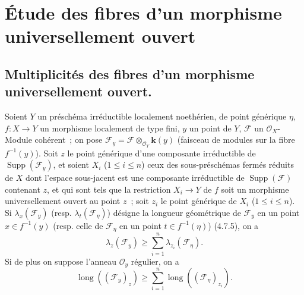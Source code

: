 \section{Étude des fibres d'un morphisme universellement ouvert}
\label{section:IV.15-fr}

\subsection{Multiplicités des fibres d'un morphisme universellement ouvert.}
\label{subsection:IV.15.1-fr}

\begin{proposition}[15.1.1]
\label{IV.15.1.1-fr}
Soient $Y$ un préschéma irréductible localement noethérien, de point générique
$\eta$, $f:X\to Y$ un morphisme localement de type fini, $y$ un point de $Y$,
$\mathcal F$ un $\mathcal O_X$-Module cohérent~; on pose
$\mathcal F_y=\mathcal F\otimes_{\mathcal O_Y}\boldsymbol{k}(y)$ \textup{(faisceau de modules
sur la fibre $f^{-1}(y)$)}. Soit $z$ le point générique d'une composante
irréductible de $\operatorname{Supp}(\mathcal F_y)$, et soient $X_i$
($1\leqslant i\leqslant n$) ceux des sous-préschémas fermés réduits de $X$ dont
l'espace sous-jacent est une composante irréductible de
$\operatorname{Supp}(\mathcal F)$ contenant $z$, et qui sont tels que la
restriction $X_i\to Y$ de $f$ soit un morphisme universellement ouvert au point
$z$~; soit $z_i$ le point générique de $X_i$ ($1\leqslant i\leqslant n$). Si
$\lambda_x(\mathcal F_y)$ (\textup{resp.} $\lambda_t(\mathcal F_\eta)$) désigne la longueur
géométrique de $\mathcal F_y$ en un point $x\in f^{-1}(y)$ (\textup{resp.} celle de
$\mathcal F_\eta$ en un point $t\in f^{-1}(\eta)$) \textup{(4.7.5)}, on a
\[
\tag{15.1.1.1}
\label{IV.15.1.1.1-fr}
  \lambda_z(\mathcal F_y)\geqslant
  \sum_{i=1}^{n}\lambda_{z_i}(\mathcal F_\eta).
\]
Si de plus on suppose l'anneau $\mathcal O_y$ régulier, on a
\[
\tag{15.1.1.2}
\label{IV.15.1.1.2-fr}
  \operatorname{long}((\mathcal F_y)_z)\geqslant
  \sum_{i=1}^{n}\operatorname{long}((\mathcal F_\eta)_{z_i}).
\]
\end{proposition}

